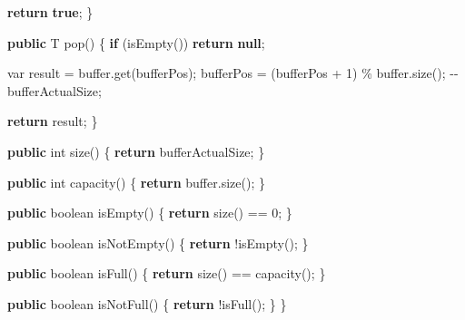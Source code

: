 \documentclass[11pt]{article}
\newenvironment{Shaded}{}{}
\newcommand{\KeywordTok}[1]{\textcolor[rgb]{0.00,0.44,0.13}{\textbf{{#1}}}}
\newcommand{\DataTypeTok}[1]{\textcolor[rgb]{0.56,0.13,0.00}{{#1}}}
\newcommand{\DecValTok}[1]{\textcolor[rgb]{0.25,0.63,0.44}{{#1}}}
\newcommand{\FunctionTok}[1]{\textcolor[rgb]{0.02,0.16,0.49}{{#1}}}
\newcommand{\NormalTok}[1]{{#1}}
\newcommand{\ControlFlowTok}[1]{\textcolor[rgb]{0.00,0.44,0.13}{\textbf{{#1}}}}
\newcommand{\OperatorTok}[1]{\textcolor[rgb]{0.40,0.40,0.40}{{#1}}}
\begin{document}
\begin{Shaded}
\begin{Highlighting}[]
        \ControlFlowTok{return} \KeywordTok{true}\OperatorTok{;}
    \OperatorTok{\}}

    \KeywordTok{public}\NormalTok{ T }\FunctionTok{pop}\OperatorTok{()} \OperatorTok{\{}
        \ControlFlowTok{if} \OperatorTok{(}\FunctionTok{isEmpty}\OperatorTok{())}
            \ControlFlowTok{return} \KeywordTok{null}\OperatorTok{;}

        \DataTypeTok{var}\NormalTok{ result }\OperatorTok{=}\NormalTok{ buffer}\OperatorTok{.}\FunctionTok{get}\OperatorTok{(}\NormalTok{bufferPos}\OperatorTok{);}
\NormalTok{        bufferPos }\OperatorTok{=} \OperatorTok{(}\NormalTok{bufferPos }\OperatorTok{+} \DecValTok{1}\OperatorTok{)} \OperatorTok{\%}\NormalTok{ buffer}\OperatorTok{.}\FunctionTok{size}\OperatorTok{();}
        \OperatorTok{{-}{-}}\NormalTok{bufferActualSize}\OperatorTok{;}

        \ControlFlowTok{return}\NormalTok{ result}\OperatorTok{;}
    \OperatorTok{\}}

    \KeywordTok{public} \DataTypeTok{int} \FunctionTok{size}\OperatorTok{()} \OperatorTok{\{}
        \ControlFlowTok{return}\NormalTok{ bufferActualSize}\OperatorTok{;}
    \OperatorTok{\}}

    \KeywordTok{public} \DataTypeTok{int} \FunctionTok{capacity}\OperatorTok{()} \OperatorTok{\{}
        \ControlFlowTok{return}\NormalTok{ buffer}\OperatorTok{.}\FunctionTok{size}\OperatorTok{();}
    \OperatorTok{\}}

    \KeywordTok{public} \DataTypeTok{boolean} \FunctionTok{isEmpty}\OperatorTok{()} \OperatorTok{\{}
        \ControlFlowTok{return} \FunctionTok{size}\OperatorTok{()} \OperatorTok{==} \DecValTok{0}\OperatorTok{;}
    \OperatorTok{\}}

    \KeywordTok{public} \DataTypeTok{boolean} \FunctionTok{isNotEmpty}\OperatorTok{()} \OperatorTok{\{}
        \ControlFlowTok{return} \OperatorTok{!}\FunctionTok{isEmpty}\OperatorTok{();}
    \OperatorTok{\}}

    \KeywordTok{public} \DataTypeTok{boolean} \FunctionTok{isFull}\OperatorTok{()} \OperatorTok{\{}
        \ControlFlowTok{return} \FunctionTok{size}\OperatorTok{()} \OperatorTok{==} \FunctionTok{capacity}\OperatorTok{();}
    \OperatorTok{\}}

    \KeywordTok{public} \DataTypeTok{boolean} \FunctionTok{isNotFull}\OperatorTok{()} \OperatorTok{\{}
        \ControlFlowTok{return} \OperatorTok{!}\FunctionTok{isFull}\OperatorTok{();}
    \OperatorTok{\}}
\OperatorTok{\}}
\end{Highlighting}
\end{Shaded}
\end{document}
